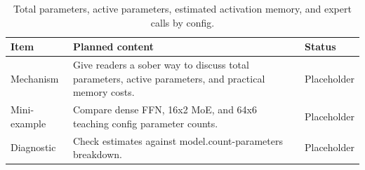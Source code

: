 \begin{table}[H]
\centering
\caption{Total parameters, active parameters, estimated activation memory, and expert calls by config.}
\label{tab:ch12-compute-memory-and-active-parameter-accounting}
\begin{tabularx}{\textwidth}{p{}X p{}}
\toprule
Item & Planned content & Status \\
\midrule
Mechanism & Give readers a sober way to discuss total parameters, active parameters, and practical memory costs. & Placeholder \\
Mini-example & Compare dense FFN, 16x2 MoE, and 64x6 teaching config parameter counts. & Placeholder \\
Diagnostic & Check estimates against model.count-parameters breakdown. & Placeholder \\
\bottomrule
\end{tabularx}
\end{table}
